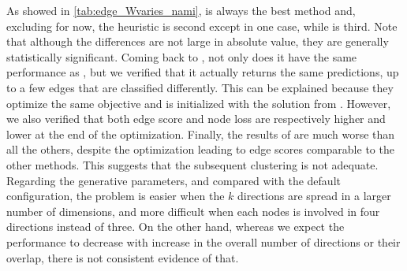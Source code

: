 As showed in \autoref{tab:edge_Wvaries_nami}, \combined{} is always the best method and, excluding
\pqt{} for now, the \lloyd{} heuristic is second except in one case, while \kmeans{} is third. Note
that although the differences are not large in absolute value, they are generally statistically
significant. Coming back to \pqt{}, not only does it have the same performance as \combined{}, but
we verified that it actually returns the same predictions, up to a few edges that are classified
differently. This can be explained because they optimize the same objective and \pqt{} is
initialized with the solution from \combined{}. However, we also verified that both edge score and
node loss are respectively higher and lower at the end of the optimization. Finally, the results of
\fwa{} are much worse than all the others, despite the optimization leading to edge scores
comparable to the other methods. This suggests that the subsequent clustering is not
adequate. Regarding the generative parameters, and compared with the default configuration, the
problem is easier when the $k$ directions are spread in a larger number of dimensions, and more
difficult when each nodes is involved in four directions instead of three. On the other hand,
whereas we expect the performance to decrease with increase in the overall number of directions or
their overlap, there is not consistent evidence of that.

